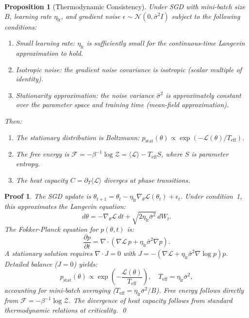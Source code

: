\documentclass[11pt, a4paper]{article}
\newtheorem{prop}[theo]{Proposition}
\theoremstyle{plain}
\newtheorem*{pf}{Proof}
\def\sF{{\mathcal F}}
\def\sL{{\mathcal L}}
\def\sZ{{\mathcal Z}}
\begin{document}
\begin{prop}[Thermodynamic Consistency]\label{prop:thermodynamic}
Under SGD with mini-batch size $B$, learning rate $\eta_{\text{lr}}$, and gradient noise $\epsilon \sim \mathcal{N}(0, \bar{\sigma}^2 I)$ subject to the following conditions:
\begin{enumerate}
    \item Small learning rate: $\eta_{\text{lr}}$ is sufficiently small for the continuous-time Langevin approximation to hold.
    \item Isotropic noise: the gradient noise covariance is isotropic (scalar multiple of identity).
    \item Stationarity approximation: the noise variance $\bar{\sigma}^2$ is approximately constant over the parameter space and training time (mean-field approximation).
\end{enumerate}
Then:
\begin{enumerate}
    \item The stationary distribution is Boltzmann: $p_{\text{stat}}(\theta) \propto \exp(-\mathcal{L}(\theta)/T_{\text{eff}})$.
    \item The free energy is $\sF = -\beta^{-1}\log\sZ = \langle\sL\rangle - T_{\text{eff}} S$, where $S$ is parameter entropy.
    \item The heat capacity $C = \partial_T\langle\sL\rangle$ diverges at phase transitions.
\end{enumerate}
\end{prop}

\begin{pf}
The SGD update is $\theta_{t+1} = \theta_t - \eta_{\text{lr}}\nabla_\theta\sL(\theta_t) + \epsilon_t$. Under condition~1, this approximates the Langevin equation:
\begin{equation}
d\theta = -\nabla_\theta\sL\,dt + \sqrt{2\eta_{\text{lr}}\bar{\sigma}^2}\,dW_t.
\end{equation}
The Fokker-Planck equation for $p(\theta,t)$ is:
\begin{equation}
\frac{\partial p}{\partial t} = \nabla\!\cdot\!\left(\nabla\sL\, p + \eta_{\text{lr}}\bar{\sigma}^2\nabla p\right).
\end{equation}
A stationary solution requires $\nabla\!\cdot\!J = 0$ with $J = -(\nabla\sL + \eta_{\text{lr}}\bar{\sigma}^2\nabla\log p)p$. Detailed balance ($J=0$) yields:
\begin{equation}
p_{\text{stat}}(\theta) \propto \exp\!\left(-\frac{\sL(\theta)}{T_{\text{eff}}}\right), \quad T_{\text{eff}} = \eta_{\text{lr}}\bar{\sigma}^2,
\end{equation}
accounting for mini-batch averaging ($T_{\text{eff}} = \eta_{\text{lr}}\bar{\sigma}^2/B$). Free energy follows directly from $\sF = -\beta^{-1}\log\sZ$. The divergence of heat capacity follows from standard thermodynamic relations at criticality.
\qed
\end{pf}
\end{document}
